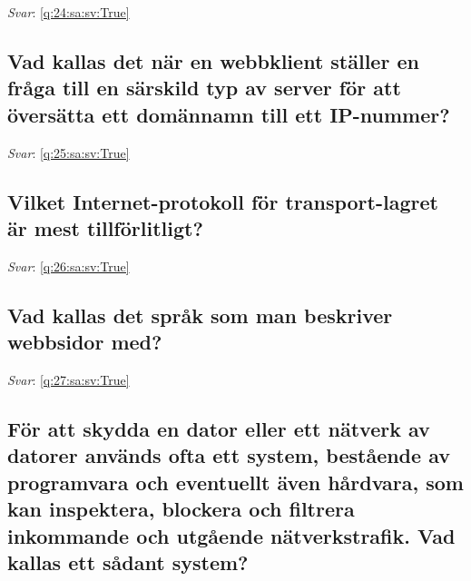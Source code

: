 \documentclass[a4paper,11pt,oneside]{article}
\begin{document}
\begin{sloppypar}
\textit{Svar}: \autoref{q:24:sa:sv:True}



\subsection{Vad kallas det n\"ar en webbklient st\"aller en fr\r{a}ga till en s\"arskild typ av server f\"or att \"overs\"atta ett dom\"annamn till ett IP-nummer?}

\label{q:25:sa:sv:False}

\vspace{2cm}

\noindent\makebox[\textwidth]{\hrulefill}

\vspace{1cm}

\textit{Svar}: \autoref{q:25:sa:sv:True}



\subsection{Vilket Internet-protokoll f\"or transport-lagret \"ar mest tillf\"orlitligt?}

\label{q:26:sa:sv:False}

\vspace{2cm}

\noindent\makebox[\textwidth]{\hrulefill}

\vspace{1cm}

\textit{Svar}: \autoref{q:26:sa:sv:True}



\subsection{Vad kallas det spr\r{a}k som man beskriver webbsidor med?}

\label{q:27:sa:sv:False}

\vspace{2cm}

\noindent\makebox[\textwidth]{\hrulefill}

\vspace{1cm}

\textit{Svar}: \autoref{q:27:sa:sv:True}



\subsection{F\"or att skydda en dator eller ett n\"atverk av datorer anv\"ands ofta ett system, best\r{a}ende av programvara och eventuellt \"aven h\r{a}rdvara, som kan inspektera, blockera och filtrera inkommande och utg\r{a}ende n\"atverkstrafik. Vad kallas ett s\r{a}dant system?}


\end{sloppypar}
\end{document}
